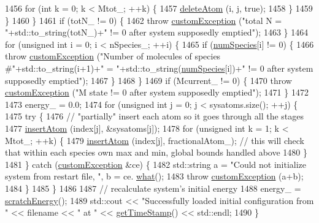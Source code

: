 \begin{DoxyCode}
1456             \textcolor{keywordflow}{for} (\textcolor{keywordtype}{int} k = 0; k < Mtot\_; ++k) \{
1457                 \hyperlink{classsim_system_acabf4fc5b5b90bba62e1449ddb3646c6}{deleteAtom} (i, j, \textcolor{keyword}{true});
1458             \}
1459         \}
1460     \}
1461     \textcolor{keywordflow}{if} (totN\_ != 0) \{
1462         \textcolor{keywordflow}{throw} \hyperlink{classcustom_exception}{customException} (\textcolor{stringliteral}{"total N = "}+std::to\_string(totN\_)+\textcolor{stringliteral}{" != 0 after system
       supposedly emptied"});
1463     \}
1464     \textcolor{keywordflow}{for} (\textcolor{keywordtype}{unsigned} \textcolor{keywordtype}{int} i = 0; i < nSpecies\_; ++i) \{
1465         \textcolor{keywordflow}{if} (\hyperlink{classsim_system_a9eea865e6dc1cff377b1e79c4d9c23f0}{numSpecies}[i] != 0) \{
1466             \textcolor{keywordflow}{throw} \hyperlink{classcustom_exception}{customException} (\textcolor{stringliteral}{"Number of molecules of species #"}+std::to\_string(i+1)+\textcolor{stringliteral}{"
       = "}+std::to\_string(\hyperlink{classsim_system_a9eea865e6dc1cff377b1e79c4d9c23f0}{numSpecies}[i])+\textcolor{stringliteral}{" != 0 after system supposedly emptied"});
1467         \}
1468     \}
1469     \textcolor{keywordflow}{if} (Mcurrent\_ != 0) \{
1470         \textcolor{keywordflow}{throw} \hyperlink{classcustom_exception}{customException} (\textcolor{stringliteral}{"M state != 0 after system supposedly emptied"});
1471     \}
1472 
1473     energy\_ = 0.0;
1474     \textcolor{keywordflow}{for} (\textcolor{keywordtype}{unsigned} \textcolor{keywordtype}{int} j = 0; j < sysatoms.size(); ++j) \{
1475         \textcolor{keywordflow}{try} \{
1476             \textcolor{comment}{// "partially" insert each atom so it goes through all the stages}
1477             \hyperlink{classsim_system_a0404e9435cc046d19b6bb990678ee069}{insertAtom} (index[j], &sysatoms[j]);
1478             \textcolor{keywordflow}{for} (\textcolor{keywordtype}{unsigned} \textcolor{keywordtype}{int} k = 1; k < Mtot\_; ++k) \{
1479                 \hyperlink{classsim_system_a0404e9435cc046d19b6bb990678ee069}{insertAtom} (index[j], fractionalAtom\_); \textcolor{comment}{// this will check that within each
       species own max and min, global bounds handled above}
1480             \}
1481         \} \textcolor{keywordflow}{catch} (\hyperlink{classcustom_exception}{customException} &ce) \{
1482             std::string a = \textcolor{stringliteral}{"Could not initialize system from restart file, "}, b = ce.
      \hyperlink{classcustom_exception_aeb6ab5848b038adfc68fde86a512f691}{what}();
1483             \textcolor{keywordflow}{throw} \hyperlink{classcustom_exception}{customException} (a+b);
1484         \}
1485     \}
1486 
1487     \textcolor{comment}{// recalculate system's initial energy}
1488     energy\_ = \hyperlink{classsim_system_a51539ed4c3bb4905b32ce428c1c537fe}{scratchEnergy}();
1489     std::cout << \textcolor{stringliteral}{"Successfully loaded initial configuration from "} << filename << \textcolor{stringliteral}{" at "} << 
      \hyperlink{utilities_8cpp_aa6d910bf51f18a75deb20c6f0fbba285}{getTimeStamp}() << std::endl;
1490 \}
\end{DoxyCode}
